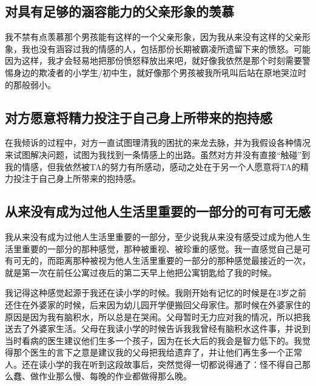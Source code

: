 


\subsection*{对具有足够的涵容能力的父亲形象的羡慕}

我不禁有点羡慕那个男孩能有这样的一个父亲形象，因为我从来没有这样的父亲形象，我也没有涵容过我的情感的人，包括那份长期被霸凌所遗留下来的愤怒。可能因为这样，我才会轻易地把那份愤怒释放出来吧，就好像我依然是那个时刻需要警惕身边的欺凌者的小学生/初中生，就好像那个男孩被我所吼叫后站在原地哭泣时的那般弱小。




\subsection*{对方愿意将精力投注于自己身上所带来的抱持感}

在我倾诉的过程中，对方一直试图理清我的困扰的来龙去脉，并为我假设各种情况来试图解决问题，试图为我找到一条情感上的出路。虽然对方并没有直接“触碰”到我的情感，但我依然被TA的努力有所感动，感动之处在于另一个人愿意将TA的精力投注于自己身上所带来的抱持感。




\subsection*{从来没有成为过他人生活里重要的一部分的可有可无感}

我从来没有成为过他人生活里重要的一部分，至少说我从来没有感受过成为他人生活里重要的一部分的那种感觉，那种被重视、被珍重的感觉。我一直感觉自己是可有可无的，而距离那种被视为他人生活里重要的一部分的那种感觉最接近的一次，就是第一次在前任公寓过夜后的第二天早上他把公寓钥匙给了我的时候。

我记得这种感觉起源于我还在读小学的时候。我刚开始有记忆的时候是在3岁之前还住在外婆家的时候，后来因为幼儿园开学便搬回父母家住。那时候在外婆家住的原因是因为我有脑积水，所以总是在哭闹。父母暂时无力应对我的情况，所以把我送去了外婆家生活。父母在我读小学的时候告诉我我曾经有脑积水这件事，并说到当时看病的医生建议他们生多一个孩子，因为在长大后的我会是智力低下的。我觉得那个医生的言下之意是建议我的父母把我给遗弃了，并让他们再生多一个正常人。还在读小学的我在听到这段故事后，突然觉得一切都说得通了：怪不得自己那么蠢、做作业那么慢、每晚的作业都做得那么晚。

